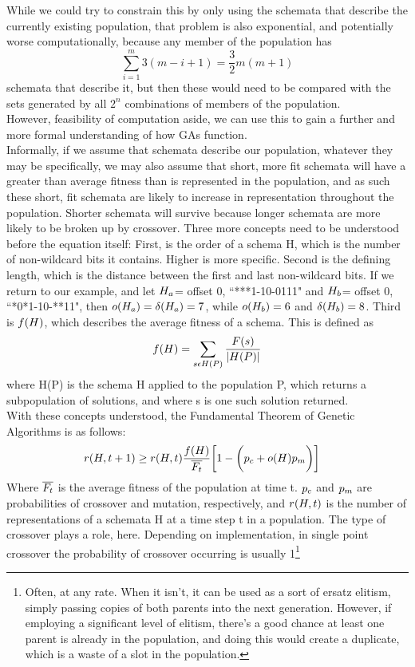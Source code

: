 While we could try to constrain this by only using the schemata that describe the currently existing population, that problem is also exponential, and potentially worse computationally, because any member of the population has $$\sum_{i=1}^{m}3(m-i+1) =\frac{3}{2}m(m+1)$$ schemata that describe it, but then these would need to be compared with the sets generated by all $2^n$ combinations of members of the population.\\
However, feasibility of computation aside, we can use this to gain a further and more formal understanding of how GAs function.\\
Informally, if we assume that schemata describe our population, whatever they may be specifically, we may also assume that short, more fit schemata will have a greater than average fitness than is represented in the population, and as such these short, fit schemata are likely to increase in representation throughout the population.  Shorter schemata will survive because longer schemata are more likely to be broken up by crossover. 
Three more concepts need to be understood before the equation itself: First,  is the order of a schema H, which is the number of non-wildcard bits it contains.  Higher is more specific.  Second is the defining length, which is the distance between the first and last non-wildcard bits.  If we return to our example, and let $H_a$= offset 0, ``***1-10-0111" and $H_b$= offset 0, ``*0*1-10-**11", then $o(H_a) = \delta(H_a)=7$, while $o(H_b) = 6$ and $\delta(H_b) = 8$.  Third is $f(H)$, which describes the average fitness of a schema.  This is defined as 
$$f(H)=\sum_{s\epsilon H(P)}^{}\frac{F(s)}{|H(P)|}$$ where H(P) is the schema H applied to the population P, which returns a subpopulation of solutions, and where s is one such solution returned.
   \\With these concepts understood, the Fundamental Theorem of Genetic Algorithms is as follows: \begin{align}
r(H, t+1)&\geq r(H, t) \frac{f(H)}{\overline{F_t}}\bigg[1-\bigg(p_c+o(H)p_m\bigg)\bigg]
\end{align}
Where $\overline{F_t}$ is the average fitness of the population at time t.  $p_c$ and $p_m$ are probabilities of crossover and mutation, respectively, and $r(H, t)$ is the number of representations of a schemata H at a time step t in a population.  The type of crossover plays a role, here.  Depending on implementation, in single point crossover the probability of crossover occurring is usually 1\footnote{Often, at any rate.  When it isn't, it can be used as a sort of ersatz elitism, simply passing copies of both parents into the next generation.  However, if employing a significant level of elitism, there's a good chance at least one parent is already in the population, and doing this would create a duplicate, which is a waste of a slot in the population.}
